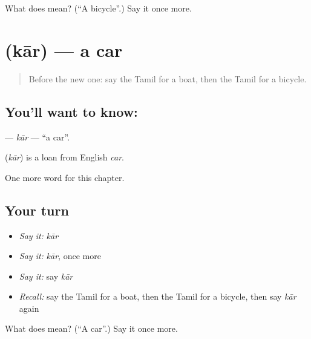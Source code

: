 \begin{tcolorbox}[breakable,colback=teal!4,colframe=teal!35!black,title={Before you move on}]
What does  mean? (\textquotedblleft{}A bicycle\textquotedblright{}.) Say it once more.
\end{tcolorbox}
\section[\texorpdfstring{\ta{கார்} (kār)}{கார் (kār)}]{ (kār) — a car}

\label{lesson:TA-C174-kar}



\begin{quote}
Before the new one: say the Tamil for a boat, then the Tamil for a bicycle.
\end{quote}

\subsection*{You'll want to know: }
\textbf{} — \emph{kār} — \textquotedblleft{}a car\textquotedblright{}.

\begin{cousinweb}
\textbf{} (\emph{kār}) is a loan from English \emph{car}.
\end{cousinweb}

\begin{grammarlens}[title={What you've built}]
One more word for this chapter.
\end{grammarlens}

\subsection*{Your turn}
\begin{itemize}
\raggedright
  \item \emph{Say it:} \emph{kār}
  \item \emph{Say it:} \emph{kār}, once more
  \item \emph{Say it:} say \emph{kār}
  \item \emph{Recall:} say the Tamil for a boat, then the Tamil for a bicycle, then say \emph{kār} again
\end{itemize}

\begin{tcolorbox}[breakable,colback=teal!4,colframe=teal!35!black,title={Before you move on}]
What does  mean? (\textquotedblleft{}A car\textquotedblright{}.) Say it once more.
\end{tcolorbox}
